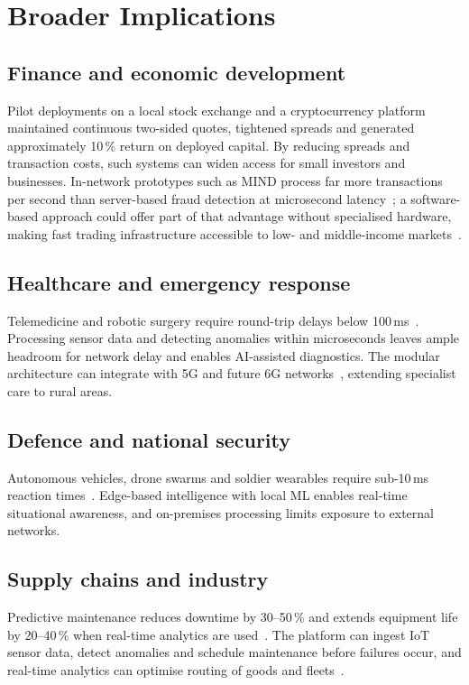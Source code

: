 \documentclass[10pt,a4paper,twocolumn]{article}
\begin{document}
\section{Broader Implications}\label{sec:impact}
\subsection{Finance and economic development}
Pilot deployments on a local stock exchange and a cryptocurrency platform maintained
continuous two-sided quotes, tightened spreads and generated approximately 10\,\% return on
deployed capital. By reducing spreads and transaction costs, such systems can widen access
for small investors and businesses. In-network prototypes such as MIND process far more
transactions per second than server-based fraud detection at microsecond
latency~\cite{mind}; a software-based approach could offer part of that advantage without
specialised hardware, making fast trading infrastructure accessible to low- and
middle-income markets~\cite{ssga}.

\subsection{Healthcare and emergency response}
Telemedicine and robotic surgery require round-trip delays below 100\,ms~\cite{fiveg}.
Processing sensor data and detecting anomalies within microseconds leaves ample headroom for
network delay and enables AI-assisted diagnostics. The modular architecture can integrate
with 5G and future 6G networks~\cite{sixg}, extending specialist care to rural areas.

\subsection{Defence and national security}
Autonomous vehicles, drone swarms and soldier wearables require sub-10\,ms reaction
times~\cite{ceragon}. Edge-based intelligence with local ML enables real-time situational
awareness, and on-premises processing limits exposure to external networks.

\subsection{Supply chains and industry}
Predictive maintenance reduces downtime by 30--50\,\% and extends equipment life by
20--40\,\% when real-time analytics are used~\cite{mckinsey}. The platform can ingest IoT
sensor data, detect anomalies and schedule maintenance before failures occur, and real-time
analytics can optimise routing of goods and fleets~\cite{iotforall}.
\end{document}
